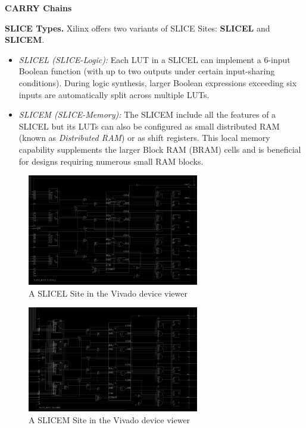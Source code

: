 \documentclass[twocolumn]{article}
\begin{document}
        

    \textbf{CARRY Chains} \quad



    \textbf{SLICE Types.}\quad 
    Xilinx offers two variants of SLICE Sites: \textbf{SLICEL} and \textbf{SLICEM}.  
    \begin{itemize}
        \item \emph{SLICEL (SLICE-Logic):} Each LUT in a SLICEL can implement a 6-input Boolean function (with up to two outputs under certain input-sharing conditions). During logic synthesis, larger Boolean expressions exceeding six inputs are automatically split across multiple LUTs.
        \item \emph{SLICEM (SLICE-Memory):} The SLICEM include all the features of a SLICEL but its LUTs can also be configured as small distributed RAM (known as \emph{Distributed RAM}) or as shift registers. This local memory capability supplements the larger Block RAM (BRAM) cells and is beneficial for designs requiring numerous small RAM blocks.
    \end{itemize}

    \begin{figure}[h]
        \centering
        \includegraphics[width=7.5cm]{figures/slicel.png}
        \caption{A SLICEL Site in the Vivado device viewer}
        \label{fig:slicel}
    \end{figure}

    \begin{figure}[h]
        \centering
        \includegraphics[width=7.5cm]{figures/slicem.png}
        \caption{A SLICEM Site in the Vivado device viewer}
        \label{fig:slicem}
    \end{figure}
\end{document}
